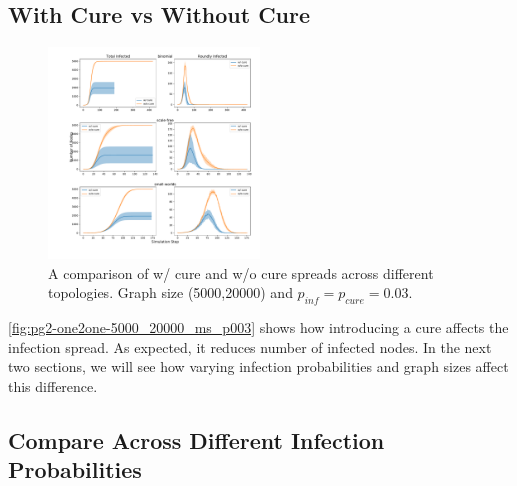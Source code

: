 \documentclass[conference]{IEEEtran}
\begin{document}
\subsection{With Cure vs Without Cure}\label{sec:one2one-cure}

\begin{figure}[htb]
  \begin{center}
	\includegraphics[width=0.5\textwidth]{img/pg2-one2one-5000_20000_ms_p003.pdf}
  \end{center}
	\caption{A comparison of w/ cure and w/o cure spreads across different topologies. Graph size (5000,20000) and $p_{inf} = p_{cure} = 0.03$.}
	\label{fig:pg2-one2one-5000_20000_ms_p003}
\end{figure}

\autoref{fig:pg2-one2one-5000_20000_ms_p003} shows how introducing a cure affects the infection spread. As expected, it reduces number of infected nodes. In the next two sections, we will see how varying infection probabilities and graph sizes affect this difference.

\subsection{Compare Across Different Infection Probabilities}\label{sec:pg2-compares-pis}
\end{document}
